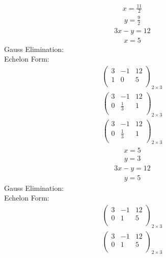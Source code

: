 \documentclass{article}
\begin{document}
\begin{align*}
x=\frac{11}{2}\end{align*}
\begin{align*}
y=\frac{9}{2}\end{align*}
\begin{align*}
3x - y=12\end{align*}
\begin{align*}
x=5\end{align*}
Gauss Elimination:\\
Echelon Form:\\
\begin{align*}
\left(
\begin{array}{cc|c}
3 & -1 & 12\\
1 & 0 & 5\\
\end{array}
\right)_{2\times 3}
\end{align*}
\begin{align*}
\left(
\begin{array}{cc|c}
3 & -1 & 12\\
0 & \frac{1}{3} & 1\\
\end{array}
\right)_{2\times 3}
\end{align*}
\begin{align*}
\left(
\begin{array}{cc|c}
3 & -1 & 12\\
0 & \frac{1}{3} & 1\\
\end{array}
\right)_{2\times 3}
\end{align*}
\begin{align*}
x=5\end{align*}
\begin{align*}
y=3\end{align*}
\begin{align*}
3x - y=12\end{align*}
\begin{align*}
y=5\end{align*}
Gauss Elimination:\\
Echelon Form:\\
\begin{align*}
\left(
\begin{array}{cc|c}
3 & -1 & 12\\
0 & 1 & 5\\
\end{array}
\right)_{2\times 3}
\end{align*}
\begin{align*}
\left(
\begin{array}{cc|c}
3 & -1 & 12\\
0 & 1 & 5\\
\end{array}
\right)_{2\times 3}
\end{align*}
\end{document}
